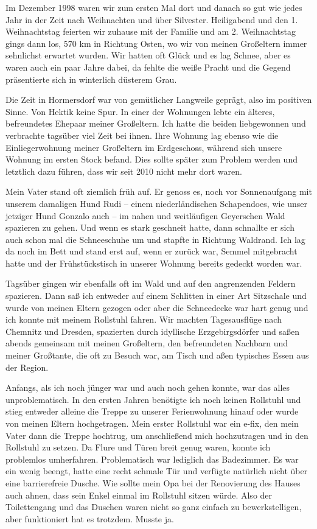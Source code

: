 \documentclass[fontsize=14pt,a4paper,headinclude,DIV=calc,automark]{scrbook}
\begin{document}
Im Dezember 1998 waren wir zum ersten Mal dort und danach so gut wie jedes Jahr in der Zeit nach Weihnachten und über Silvester. Heiligabend und den 1. Weihnachtstag feierten wir zuhause mit der Familie und am 2. Weihnachtstag gings dann los, 570 km in Richtung Osten, wo wir von meinen Großeltern immer sehnlichst erwartet wurden. Wir hatten oft Glück und es lag Schnee, aber es waren auch ein paar Jahre dabei, da fehlte die weiße Pracht und die Gegend präsentierte sich in winterlich düsterem Grau.

Die Zeit in Hormersdorf war von gemütlicher Langweile geprägt, also im positiven Sinne. Von Hektik keine Spur. In einer der Wohnungen lebte ein älteres, befreundetes Ehepaar meiner Großeltern. Ich hatte die beiden liebgewonnen und verbrachte tagsüber viel Zeit bei ihnen. Ihre Wohnung lag ebenso wie die Einliegerwohnung meiner Großeltern im Erdgeschoss, während sich unsere Wohnung im ersten Stock befand. Dies sollte später zum Problem werden und letztlich dazu führen, dass wir seit 2010 nicht mehr dort waren.

Mein Vater stand oft ziemlich früh auf. Er genoss es, noch vor Sonnenaufgang mit unserem damaligen Hund Rudi – einem niederländischen Schapendoes, wie unser jetziger Hund Gonzalo auch – im nahen und weitläufigen Geyerschen Wald spazieren zu gehen. Und wenn es stark geschneit hatte, dann schnallte er sich auch schon mal die Schneeschuhe um und stapfte in Richtung Waldrand. Ich lag da noch im Bett und stand erst auf, wenn er zurück war, Semmel mitgebracht hatte und der Frühstückstisch in unserer Wohnung bereits gedeckt worden war.

Tagsüber gingen wir ebenfalls oft im Wald und auf den angrenzenden Feldern spazieren. Dann saß ich entweder auf einem Schlitten in einer Art Sitzschale und wurde von meinen Eltern gezogen oder aber die Schneedecke war hart genug und ich konnte mit meinem Rollstuhl fahren. Wir machten Tagesausflüge nach Chemnitz und Dresden, spazierten durch idyllische Erzgebirgsdörfer und saßen abends gemeinsam mit meinen Großeltern, den befreundeten Nachbarn und meiner Großtante, die oft zu Besuch war, am Tisch und aßen typisches Essen aus der Region.

Anfangs, als ich noch jünger war und auch noch gehen konnte, war das alles unproblematisch. In den ersten Jahren benötigte ich noch keinen Rollstuhl und stieg entweder alleine die Treppe zu unserer Ferienwohnung hinauf oder wurde von meinen Eltern hochgetragen. Mein erster Rollstuhl war ein e-fix, den mein Vater dann die Treppe hochtrug, um anschließend mich hochzutragen und in den Rollstuhl zu setzen. Da Flure und Türen breit genug waren, konnte ich problemlos umherfahren. Problematisch war lediglich das Badezimmer. Es war ein wenig beengt, hatte eine recht schmale Tür und verfügte natürlich nicht über eine barrierefreie Dusche. Wie sollte mein Opa bei der Renovierung des Hauses auch ahnen, dass sein Enkel einmal im Rollstuhl sitzen würde. Also der Toilettengang und das Duschen waren nicht so ganz einfach zu bewerkstelligen, aber funktioniert hat es trotzdem. Musste ja.
\end{document}
